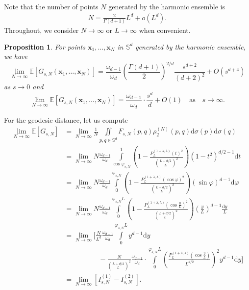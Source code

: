 \documentclass[a4paper,11pt]{amsart}
\newtheorem{prop}{Proposition}
\begin{document}
Note that the number of points $N$ generated by the harmonic ensemble is
\begin{align}\label{NL relation}
N=\frac{2}{\Gamma(d+1)}L^d+o(L^d).    
\end{align}
Throughout, we consider $N\rightarrow\infty$ or $L\rightarrow\infty$ when convenient.
\begin{prop}\label{harmonic proposition}
 For points $\mathbf{x}_1,\dots,\mathbf{x}_N$ in $\mathbb{S}^d$ generated by the harmonic ensemble, we have
 \begin{equation*}
     \lim\limits_{N\rightarrow\infty}\mathbb{E}[G_{s,N}(\mathbf{x}_1,\dots,\mathbf{x}_N)]=\frac{\omega_{d-1}}{\omega_d} \left(\frac{\Gamma(d+1)}{2}\right)^{2/d}\frac{s^{d+2}}{(d+2)^2}+O(s^{d+4})
\end{equation*}
as $s\rightarrow 0$ and 
\begin{equation*}
     \lim\limits_{N\rightarrow\infty}\mathbb{E}[G_{s,N}(\mathbf{x}_1,\dots,\mathbf{x}_N)]=\frac{\omega_{d-1}}{\omega_d}\cdot\frac{s^d}{d}+O(1)\quad\text{as}\quad s\rightarrow\infty.
\end{equation*}

\end{prop}
For the geodesic distance, let us compute 
\begin{align*}
    \lim\limits_{N\rightarrow\infty}\mathbb{E}[G_{s,N}]&=\lim\limits_{N\rightarrow\infty}\frac{1}{N}\iint\limits_{p,q\in\mathbb{S}^d}F_{s,N}(p,q)\rho_2^{(N)}(p,q)\mathrm{d}\sigma(p)\mathrm{d}\sigma(q)
    \\ &=\lim\limits_{N\rightarrow\infty}N\frac{\omega_{d-1}}{\omega_d}\int\limits_{\cos\varphi_{s,N}}^1\left(1-\frac{P_L^{(1+\lambda,\lambda)}(t)^2}{\binom{L+d/2}{L}^2}\right)(1-t^2)^{d/2-1}\mathrm{d}t
    \\ &=\lim\limits_{N\rightarrow\infty}N\frac{\omega_{d-1}}{\omega_d}\int\limits_0^{\varphi_{s,N}}\left(1-\frac{P_L^{(1+\lambda,\lambda)}(\cos \varphi )^2}{\binom{L+d/2}{L}^2}\right)(\sin\varphi)^{d-1}\mathrm{d}\varphi
    \\ &=\lim\limits_{N\rightarrow\infty} N\frac{\omega_{d-1}}{\omega_d}\int\limits_0^{\varphi_{s,N} L}\left(1-\frac{P_L^{(1+\lambda,\lambda)}\left(\cos \frac{y}{L} \right)^2}{\binom{L+d/2}{L}^2}\right)\left(\frac{y}{L}\right)^{d-1}\frac{\mathrm{d}y}{L}
    \\ &=\lim\limits_{N\rightarrow\infty}\Bigg[\frac{N}{L^d }\frac{\omega_{d-1}}{\omega_d}\int\limits_0^{\varphi_{s,N} L}y^{d-1}\mathrm{d}y
    \\ & \qquad \qquad \quad -\frac{N}{\binom{L+d/2}{L}^2}\frac{\omega_{d-1}}{\omega_d}\cdot\int\limits_0^{\varphi_{s,N} L}\left(\frac{P_L^{(1+\lambda,\lambda)}\left(\cos \frac{y}{L} \right)}{L^{d/2}}\right)^2 y^{d-1}\mathrm{d}y\Bigg]
    \\ &=\lim\limits_{N\rightarrow\infty}\left[I^{(1)}_{s,N}-I^{(2)}_{s,N}\right].
\end{align*}
\end{document}
